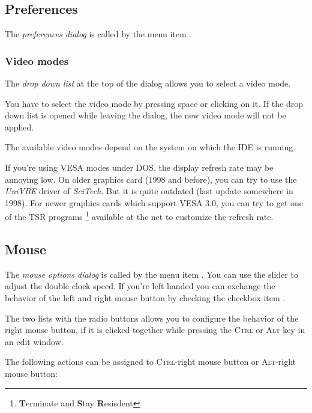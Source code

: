\subsection{Preferences}
The \emph{preferences dialog} is called by the menu item
.


\subsubsection{Video modes}
The \emph{drop down list} at the top of the dialog allows you
to select a video mode.

\begin{remark}
You have to select the video mode by pressing space or clicking
on it. If the drop down list is opened while leaving the dialog,
the new video mode will not be applied.
\end{remark}

The available video modes depend on the system on which the IDE
is running. 

\begin{remark}
If you're using VESA modes under DOS, the display refresh rate may be
annoying low. On older graphics card (1998 and before),
you can try to use the \emph{UniVBE} driver of \emph{SciTech}. But
it is quite outdated (last update somewhere in 1998). For newer
graphics cards which support VESA 3.0, you can try to get one
of the TSR programs
\footnote{\textbf{T}erminate and \textbf{S}tay \textbf{R}esisdent}
available at the net to customize the refresh rate.
\end{remark}

\subsection{Mouse}
\label{ide:prefmouse}
The \emph{mouse options dialog} is called by the menu item
. You can use the slider to adjust the
double clock speed. If you're left handed you can exchange the
behavior of the left and right mouse button by checking the checkbox
item .

The two lists with the radio buttons allows you
to configure the behavior of the
right mouse button, if it is clicked together while
pressing the \textsc{Ctrl} or
\textsc{Alt} key in an edit window.

The following actions can be assigned to \textsc{Ctrl}-right mouse button or
\textsc{Alt}-right mouse button:

